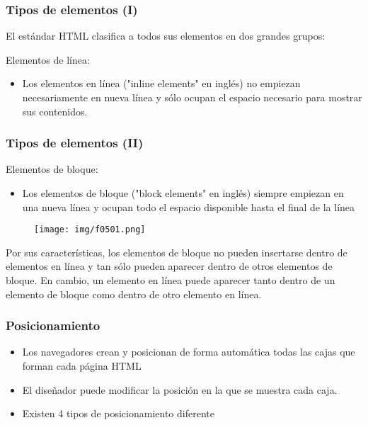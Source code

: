 
\begin{frame}
\frametitle{Tipos de elementos (I)}

El estándar HTML clasifica a todos sus elementos en dos grandes grupos:

Elementos de línea:

\begin{itemize}
  \item Los elementos en línea ("inline elements" en inglés) no empiezan necesariamente en nueva línea y sólo ocupan el espacio necesario para mostrar sus contenidos.

\end{itemize}

\end{frame}


\begin{frame}
\frametitle{Tipos de elementos (II)}

Elementos de bloque:

\begin{itemize}
  \item Los elementos de bloque ("block elements" en inglés) siempre empiezan en una nueva línea y ocupan todo el espacio disponible hasta el final de la línea
\end{itemize}

\begin{center}
\begin{figure}[p]
\texttt{[image: img/f0501.png]}
\end{figure}
\end{center}

Por sus características, los elementos de bloque no pueden insertarse dentro de elementos en línea y tan sólo pueden aparecer dentro de otros elementos de bloque. En cambio, un elemento en línea puede aparecer tanto dentro de un elemento de bloque como dentro de otro elemento en línea.

\end{frame}



\begin{frame}
\frametitle{Posicionamiento}

\begin{itemize}
  \item Los navegadores crean y posicionan de forma automática todas las cajas que forman cada página HTML
  \item El diseñador puede modificar la posición en la que se muestra cada caja.
  \item Existen 4 tipos de posicionamiento diferente
\end{itemize}

\end{frame}


